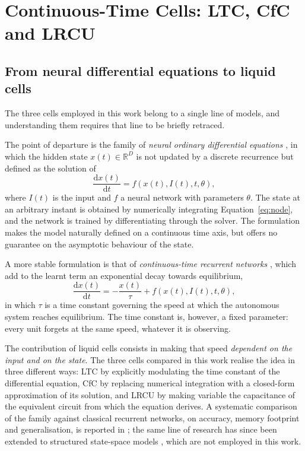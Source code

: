 \section{Continuous-Time Cells: LTC, CfC and LRCU}
\label{sec:lnn-taxonomy}

\subsection{From neural differential equations to liquid cells}
\label{sec:lnn-background}

The three cells employed in this work belong to a single line of models, and
understanding them requires that line to be briefly retraced.

The point of departure is the family of \emph{neural ordinary differential
equations} \cite{chen2018neuralode}, in which the hidden state
$x(t) \in \mathbb{R}^{D}$ is not updated by a discrete recurrence but defined as
the solution of
\begin{equation}
  \frac{\mathrm{d}x(t)}{\mathrm{d}t} = f\!\left(x(t), I(t), t, \theta\right),
  \label{eq:node}
\end{equation}
where $I(t)$ is the input and $f$ a neural network with parameters $\theta$. The
state at an arbitrary instant is obtained by numerically integrating
Equation~\eqref{eq:node}, and the network is trained by differentiating through
the solver. The formulation makes the model naturally defined on a continuous
time axis, but offers no guarantee on the asymptotic behaviour of the state.

A more stable formulation is that of \emph{continuous-time recurrent networks}
\cite{funahashi1993ctrnn}, which add to the learnt term an exponential decay
towards equilibrium,
\begin{equation}
  \frac{\mathrm{d}x(t)}{\mathrm{d}t}
    = -\frac{x(t)}{\tau} + f\!\left(x(t), I(t), t, \theta\right),
  \label{eq:ctrnn}
\end{equation}
in which $\tau$ is a time constant governing the speed at which the autonomous
system reaches equilibrium. The time constant is, however, a fixed parameter:
every unit forgets at the same speed, whatever it is observing.

The contribution of liquid cells consists in making that speed \emph{dependent
on the input and on the state}. The three cells compared in this work realise
the idea in three different ways: LTC by explicitly modulating the time constant
of the differential equation, CfC by replacing numerical integration with a
closed-form approximation of its solution, and LRCU by making variable the
capacitance of the equivalent circuit from which the equation derives. A
systematic comparison of the family against classical recurrent networks, on
accuracy, memory footprint and generalisation, is reported in
\cite{zong2025lnnsurvey}; the same line of research has since been extended to
structured state-space models \cite{hasani2023liquids4}, which are not employed
in this work.

